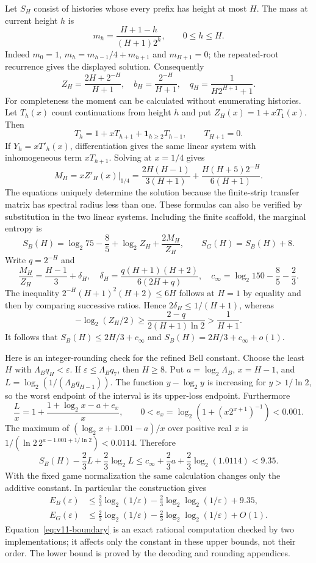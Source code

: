 Let $S_H$ consist of histories whose every prefix has height at most $H$. The mass at current height $h$ is
\[
 m_h=\frac{H+1-h}{(H+1)2^h},\qquad 0\le h\le H.
\]
Indeed $m_0=1$, $m_h=m_{h-1}/4+m_{h+1}$ and $m_{H+1}=0$; the repeated-root recurrence gives the displayed solution. Consequently
\begin{equation}\label{eq:v11-height-formulas}
 Z_H=\frac{2H+2^{-H}}{H+1},\quad b_H=\frac{2^{-H}}{H+1},\quad
 q_H=\frac1{H2^{H+1}+1}.
\end{equation}
For completeness the moment can be calculated without enumerating histories. Let $T_h(x)$ count continuations from height $h$ and put $Z_H(x)=1+xT_1(x)$. Then
\[
 T_h=1+xT_{h+1}+\mathbf1_{h\ge2}T_{h-1},\qquad T_{H+1}=0.
\]
If $Y_h=xT'_h(x)$, differentiation gives the same linear system with inhomogeneous term $xT_{h+1}$. Solving at $x=1/4$ gives
\[
 M_H=xZ'_H(x)\big|_{1/4}
 =\frac{2H(H-1)}{3(H+1)}+\frac{H(H+5)2^{-H}}{6(H+1)}.
\]
The equations uniquely determine the solution because the finite-strip transfer matrix has spectral radius less than one. These formulas can also be verified by substitution in the two linear systems.
Including the finite scaffold, the marginal entropy is
\begin{equation}\label{eq:v11-height-entropy}
 S_B(H)=\log_2 75-\frac85+\log_2Z_H+\frac{2M_H}{Z_H},\qquad S_G(H)=S_B(H)+8.
\end{equation}
Write $q=2^{-H}$ and
\[
 \frac{M_H}{Z_H}=\frac{H-1}{3}+\delta_H,\quad
 \delta_H=\frac{q(H+1)(H+2)}{6(2H+q)},\quad
 c_\infty=\log_2 150-\frac85-\frac23.
\]
The inequality $2^{-H}(H+1)^2(H+2)\le6H$ follows at $H=1$ by equality and then by comparing successive ratios. Hence $2\delta_H\le1/(H+1)$, whereas
\[
 -\log_2(Z_H/2)\ge\frac{2-q}{2(H+1)\ln2}>\frac1{H+1}.
\]
It follows that $S_B(H)\le2H/3+c_\infty$ and $S_B(H)=2H/3+c_\infty+o(1)$.

Here is an integer-rounding check for the refined Bell constant. Choose the least $H$ with $\Lambda_Bq_H<\varepsilon$. If $\varepsilon\le\Lambda_Bq_7$, then $H\ge8$. Put $a=\log_2\Lambda_B$, $x=H-1$, and $L=\log_2(1/(\Lambda_Bq_{H-1}))$. The function $y-\log_2y$ is increasing for $y>1/\ln2$, so the worst endpoint of the interval is its upper-loss endpoint. Furthermore
\[
 \frac Lx=1+\frac{1+\log_2x-a+e_x}{x},\qquad
 0<e_x=\log_2(1+(x2^{x+1})^{-1})<0.001.
\]
The maximum of $(\log_2x+1.001-a)/x$ over positive real $x$ is
$1/(\ln2\,2^{a-1.001+1/\ln2})<0.0114$. Therefore
\[
 S_B(H)-\frac23L+\frac23\log_2 L
 \le c_\infty+\frac23a+\frac23\log_2(1.0114)<9.35.
\]
With the fixed game normalization the same calculation changes only the additive constant. In particular the construction gives
\begin{align*}
 E_B(\varepsilon)&\le\frac23\log_2(1/\varepsilon)-\frac23\log_2\log_2(1/\varepsilon)+9.35,\\
 E_G(\varepsilon)&\le\frac23\log_2(1/\varepsilon)-\frac23\log_2\log_2(1/\varepsilon)+O(1).
\end{align*}
Equation~\eqref{eq:v11-boundary} is an exact rational computation checked by two implementations; it affects only the constant in these upper bounds, not their order. The lower bound is proved by the decoding and rounding appendices.

